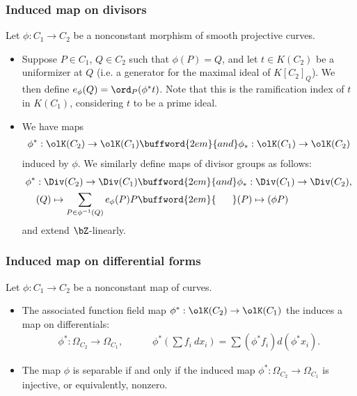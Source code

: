 	\bigskip

	\subsubsection{Induced map on divisors}
	Let $\phi:C_1 \to C_2$ be a nonconstant morphism of smooth projective curves.
	\begin{itemize}
		\item Suppose $P \in C_1$, $Q \in C_2$ such that $\phi(P) = Q$, and let $t \in K(C_2)$ be a uniformizer at $Q$ (i.e. a generator for the maximal ideal of $K[C_2]_Q$). We then define $e_\phi(Q) = \ord_P(\phi^* t)$. Note that this is the ramification index of $t$ in $K(C_1)$, considering $t$ to be a prime ideal.
		\item We have maps
			\begin{align*}
				\phi^*:\olK(C_2)\to \olK(C_1) \buffword{2em}{and} \phi_*:\olK(C_1)\to \olK(C_2)
			\end{align*}
			induced by $\phi$. We similarly define maps of divisor groups as follows:
			\begin{align*}
				\phi^*:\Div(C_2) \to \Div(C_1) &\buffword{2em}{and} \phi_*:\Div(C_1)\to \Div(C_2), \\
				(Q)\mapsto \sum_{P \in \phi^{-1}(Q)} e_\phi(P)P &\buffword{2em}{\phantom{and}} (P) \mapsto (\phi P)
			\end{align*}
			and extend $\bZ$-linearly.
	\end{itemize}

	\bigskip

	\subsubsection{Induced map on differential forms}
	Let $\phi:C_1\to C_2$ be a nonconstant map of curves.
	\begin{itemize}
		\item The associated function field map $\phi^*:\olK(C_2)\to \olK(C_1)$ the induces a map on differentials:
	        \begin{align*}
	            \phi^*:\Omega_{C_2} \to \Omega_{C_1}, \hspace{3em} \phi^*\left(\sum f_i~dx_i\right) = \sum(\phi^*f_i)d(\phi^*x_i).
	        \end{align*}
		\item The map $\phi$ is separable if and only if the induced map  $\phi^*:\Omega_{C_2} \to \Omega_{C_1}$ is injective, or equivalently, nonzero.
	\end{itemize}

